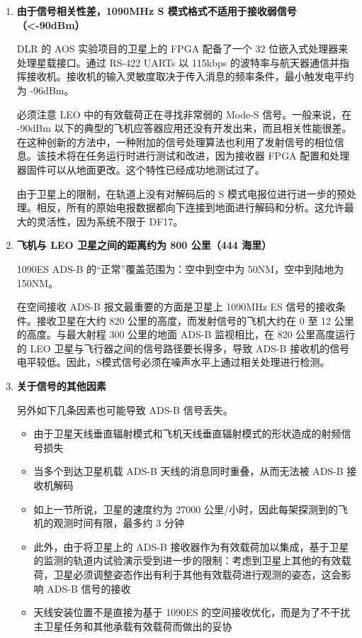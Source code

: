 \begin{enumerate}
    \item \textbf{由于信号相关性差，1090MHz S 模式格式不适用于接收弱信号（<-90dBm）}

    DLR 的 AOS 实验项目的卫星上的 FPGA 配备了一个 32 位嵌入式处理器来处理星载接口。通过 RS-422 UARTs 以 115kbps 的波特率与航天器通信并指挥接收机。接收机的输入灵敏度取决于传入消息的频率条件，最小触发电平约为 -96dBm。

    必须注意 LEO 中的有效载荷正在寻找非常弱的 Mode-S 信号。一般来说，在 -90dBm 以下的典型的飞机应答器应用还没有开发出来，而且相关性能很差。在这种创新的方法中，一种附加的信号处理算法也利用了发射信号的相位信息。该技术将在任务运行时进行测试和改进，因为接收器 FPGA 配置和处理器固件可以从地面更改。这个特性已经成功地测试过了。

    由于卫星上的限制，在轨道上没有对解码后的 S 模式电报位进行进一步的预处理。相反，所有的原始电报数据都向下连接到地面进行解码和分析。这允许最大的灵活性，因为系统不限于 DF17。


    \item \textbf{飞机与 LEO 卫星之间的距离约为 800 公里（444 海里）}

    1090ES ADS-B 的“正常”覆盖范围为：空中到空中为 50NM，空中到陆地为 150NM。

    在空间接收 ADS-B 报文最重要的方面是卫星上 1090MHz ES 信号的接收条件。接收卫星在大约 820 公里的高度，而发射信号的飞机大约在 0 至 12 公里的高度。与最大射程 300 公里的地面 ADS-B 监视相比，在 820 公里高度运行的 LEO 卫星与飞行器之间的信号路径要长得多，导致 ADS-B 接收机的信号电平较低。因此，S模式信号必须在噪声水平上通过相关处理进行检测。

    \item \textbf{关于信号的其他因素}

    另外如下几条因素也可能导致 ADS-B 信号丢失。

    \begin{itemize}
        \item 由于卫星天线垂直辐射模式和飞机天线垂直辐射模式的形状造成的射频信号损失

        \item 当多个到达卫星机载 ADS-B 天线的消息同时重叠，从而无法被 ADS-B 接收机解码

        \item 如上一节所说，卫星的速度约为 27000 公里/小时，因此每架探测到的飞机的观测时间有限，最多约 3 分钟

        \item 此外，由于将卫星上的 ADS-B 接收器作为有效载荷加以集成，基于卫星的监测的轨道内试验演示受到进一步的限制：考虑到卫星上其他的有效载荷，卫星必须调整姿态作出有利于其他有效载荷进行观测的姿态，这会影响 ADS-B 信号的接收

        \item 天线安装位置不是直接为基于 1090ES 的空间接收优化，而是为了不干扰主卫星任务和其他承载有效载荷而做出的妥协

    \end{itemize}

\end{enumerate}

